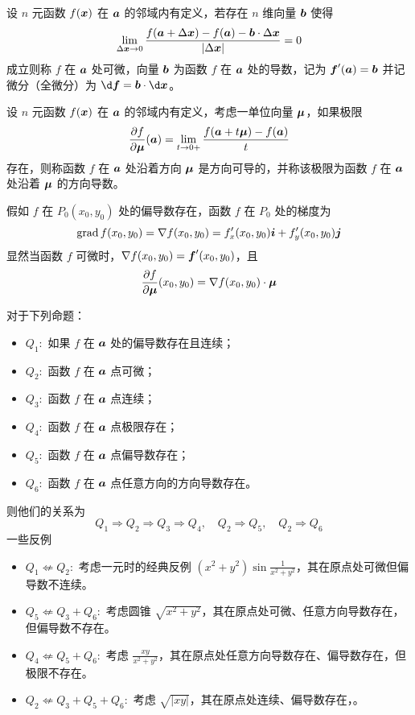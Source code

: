 \begin{definition}[全微分]
	设 $n$ 元函数 $f(\boldsymbol{x})$ 在 $\boldsymbol{a}$ 的邻域内有定义，若存在 $n$ 维向量 $\boldsymbol{b}$ 使得
	\[ \lim_{\Delta \boldsymbol{x} \to 0} \frac{f(\boldsymbol{a} + \Delta \boldsymbol{x}) - f(\boldsymbol{a}) - \boldsymbol{b} \cdot \Delta \boldsymbol{x}}{|\Delta \boldsymbol{x}|} = 0 \]
	成立则称 $f$ 在 $\boldsymbol{a}$ 处可微，向量 $\boldsymbol{b}$ 为函数 $f$ 在 $\boldsymbol{a}$ 处的导数，记为 $\boldsymbol{f}'(\boldsymbol{a}) = \boldsymbol{b}$ 并记微分（全微分）为 $\d \vbf{f} = \vbf{b} \cdot \d \vbf{x}$。
\end{definition}

\begin{definition}[方向导数]
	设 $n$ 元函数 $f(\boldsymbol{x})$ 在 $\boldsymbol{a}$ 的邻域内有定义，考虑一单位向量 $\boldsymbol{\mu}$，如果极限
	\[ \frac{\partial f}{\partial \boldsymbol{\mu}}(\boldsymbol{a}) = \lim_{t \to 0+} \frac{f(\boldsymbol{a} + t \boldsymbol{\mu}) - f(\boldsymbol{a})}{t} \]
	存在，则称函数 $f$ 在 $\boldsymbol{a}$ 处沿着方向 $\boldsymbol{\mu}$ 是方向可导的，并称该极限为函数 $f$ 在 $\boldsymbol{a}$ 处沿着 $\boldsymbol{\mu}$ 的方向导数。
\end{definition}

假如 $f$ 在 $P_0(x_0, y_0)$ 处的偏导数存在，函数 $f$ 在 $P_0$ 处的梯度为
\[ \operatorname{grad} f (x_0, y_0) = \nabla f(x_0, y_0) = f_x'(x_0, y_0) \boldsymbol{i} + f_y'(x_0, y_0) \boldsymbol{j} \]
显然当函数 $f$ 可微时，$\nabla f(x_0, y_0) = \boldsymbol{f}'(x_0, y_0)$，且
\[ \frac{\partial f}{\partial \boldsymbol{\mu}} (x_0, y_0) = \nabla f(x_0, y_0) \cdot \boldsymbol{\mu} \]

对于下列命题：
\begin{itemize}
	\item $Q_1:$ 如果 $f$ 在 $\boldsymbol{a}$ 处的偏导数存在且连续；
	\item $Q_2:$ 函数 $f$ 在 $\boldsymbol{a}$ 点可微；
	\item $Q_3:$ 函数 $f$ 在 $\boldsymbol{a}$ 点连续；
	\item $Q_4:$ 函数 $f$ 在 $\boldsymbol{a}$ 点极限存在；
	\item $Q_5:$ 函数 $f$ 在 $\boldsymbol{a}$ 点偏导数存在；
	\item $Q_6:$ 函数 $f$ 在 $\boldsymbol{a}$ 点任意方向的方向导数存在。
\end{itemize}
则他们的关系为
\[ Q_1 \Rightarrow Q_2 \Rightarrow Q_3 \Rightarrow Q_4, \quad Q_2 \Rightarrow Q_5, \quad Q_2 \Rightarrow Q_6 \]
一些反例
\begin{itemize}
	\item $Q_1 \not\Leftarrow Q_2:$ 考虑一元时的经典反例 $(x^2+y^2) \sin \frac{1}{x^2+y^2}$，其在原点处可微但偏导数不连续。
	\item $Q_5 \not\Leftarrow Q_3 + Q_6:$ 考虑圆锥 $\sqrt{x^2+y^2}$，其在原点处可微、任意方向导数存在，但偏导数不存在。
	\item $Q_4 \not\Leftarrow Q_5 + Q_6:$ 考虑 $\frac{xy}{x^2+y^2}$，其在原点处任意方向导数存在、偏导数存在，但极限不存在。
	\item $Q_2 \not\Leftarrow Q_3 + Q_5 + Q_6:$ 考虑 $\sqrt{|xy|}$，其在原点处连续、偏导数存在，。
\end{itemize}

